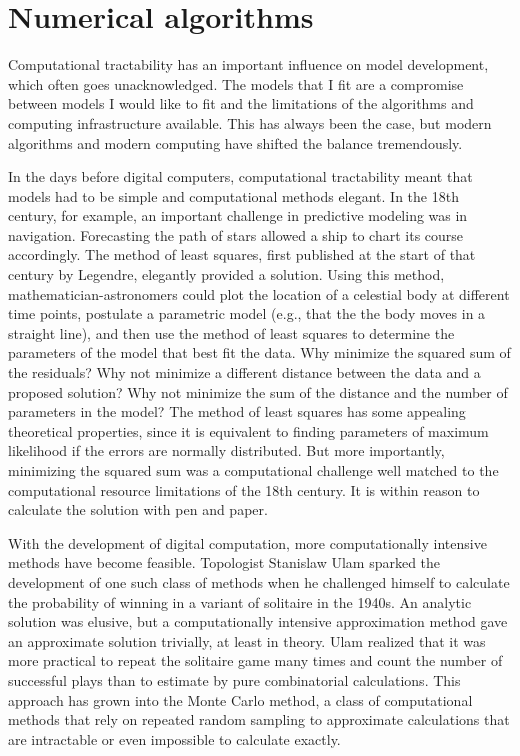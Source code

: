 \chapter{Numerical algorithms}
\label{numerical-algorithms}

Computational tractability has an important influence on model
development, which often goes unacknowledged. The models that I fit
are a compromise between models I would like to fit and the
limitations of the algorithms and computing infrastructure
available. This has always been the case, but modern algorithms and
modern computing have shifted the balance tremendously.

In the days before digital computers, computational tractability meant
that models had to be simple and computational methods elegant. In the
18th century, for example, an important challenge in predictive
modeling was in navigation.\cite{williams_sails_1993} Forecasting the
path of stars allowed a ship to chart its course accordingly. The
method of least squares, first published at the start of that century
by Legendre, elegantly provided a
solution.\cite{legendre_nouvelles_2011} Using this method,
mathematician-astronomers could plot the location of a celestial body
at different time points, postulate a parametric model (e.g.,
that the the body moves in a straight line), and then use the method
of least squares to determine the parameters of the model that best
fit the data.  Why minimize the squared sum of the residuals?  Why not
minimize a different distance between the data and a proposed
solution? Why not minimize the sum of the distance and the number of
parameters in the model? The method of least squares has some
appealing theoretical properties, since it is equivalent to finding
parameters of maximum likelihood if the errors are normally
distributed. But more importantly, minimizing the squared sum was a
computational challenge well matched to the computational resource
limitations of the 18th century.  It is within reason to calculate the
solution with pen and paper.

With the development of digital computation, more computationally
intensive methods have become feasible. Topologist Stanislaw Ulam
sparked the development of one such class of methods when he
challenged himself to calculate the probability of winning in a
variant of solitaire in the 1940s. An analytic solution was elusive,
but a computationally intensive approximation method gave an approximate
solution trivially, at least in theory. Ulam realized that it was
more practical to repeat the solitaire game many times and count
the number of successful plays than to estimate by pure
combinatorial calculations.  This approach has grown into the Monte
Carlo method, a class of computational methods that rely on repeated
random sampling to approximate calculations that are intractable or
even impossible to calculate exactly.\cite{eckhardt_stan_1987}

